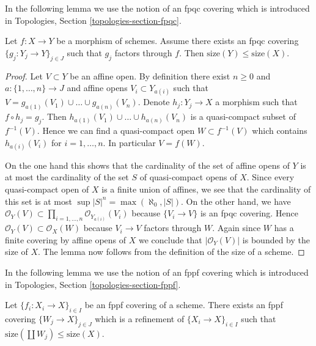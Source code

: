 \noindent
In the following lemma we use the notion of an fpqc covering which
is introduced in Topologies, Section \ref{topologies-section-fpqc}.

\begin{lemma}
\label{lemma-bound-by-covering}
Let $f : X \to Y$ be a morphism of schemes. Assume there exists an
fpqc covering $\{g_j : Y_j \to Y\}_{j \in J}$ such that $g_j$ factors
through $f$. Then $\text{size}(Y) \leq \text{size}(X)$.
\end{lemma}

\begin{proof}
Let $V \subset Y$ be an affine open. By definition there exist
$n \geq 0$ and $a : \{1, \ldots, n\} \to J$ and affine opens
$V_i \subset Y_{a(i)}$ such that
$V = g_{a(1)}(V_1) \cup \ldots \cup g_{a(n)}(V_n)$.
Denote $h_j : Y_j \to X$ a morphism such that $f \circ h_j = g_j$.
Then $h_{a(1)}(V_1) \cup \ldots \cup h_{a(n)}(V_n)$ is
a quasi-compact subset of $f^{-1}(V)$. Hence we can find a
quasi-compact open $W \subset f^{-1}(V)$ which contains
$h_{a(i)}(V_i)$ for $i = 1, \ldots, n$.
In particular $V = f(W)$.

\medskip\noindent
On the one hand this shows that the cardinality of the set of
affine opens of $Y$ is at most the cardinality of the set $S$ of
quasi-compact opens of $X$. Since every quasi-compact open of
$X$ is a finite union of affines, we see that the cardinality
of this set is at most $\sup |S|^n = \max(\aleph_0, |S|)$.
On the other hand, we have
$\mathcal{O}_Y(V) \subset \prod_{i = 1, \ldots, n} \mathcal{O}_{Y_{a(i)}}(V_i)$
because $\{V_i \to V\}$ is an fpqc covering. Hence
$\mathcal{O}_Y(V) \subset \mathcal{O}_X(W)$ because $V_i \to V$
factors through $W$. Again since $W$ has a finite covering by
affine opens of $X$ we conclude that $|\mathcal{O}_Y(V)|$
is bounded by the size of $X$. The lemma now follows
from the definition of the size of a scheme.
\end{proof}

\noindent
In the following lemma we use the notion of an fppf covering which
is introduced in Topologies, Section \ref{topologies-section-fppf}.

\begin{lemma}
\label{lemma-bound-fppf-covering}
Let $\{f_i : X_i \to X\}_{i \in I}$ be an fppf covering of a scheme.
There exists an fppf covering $\{W_j \to X\}_{j \in J}$
which is a refinement of $\{X_i \to X\}_{i \in I}$ such that
$\text{size}(\coprod W_j) \leq \text{size}(X)$.
\end{lemma}

